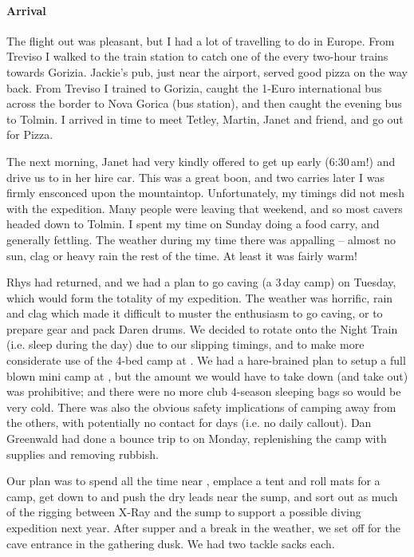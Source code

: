 \paragraph{Arrival}

The flight out was pleasant, but I had a lot of travelling to do in Europe. From Treviso I walked to the train station to catch one of the every two-hour trains towards Gorizia. Jackie's pub, just near the airport, served good pizza on the way back. From Treviso I trained to Gorizia, caught the 1-Euro international bus across the border to Nova Gorica (bus station), and then caught the evening bus to Tolmin. I arrived in time to meet Tetley, Martin, Janet and friend, and go out for Pizza.

The next morning, Janet had very kindly offered to get up early (6:30\,am!) and drive us to  in her hire car. This was a great boon, and two carries later I was firmly ensconced upon the mountaintop. Unfortunately, my timings did not mesh with the expedition. Many people were leaving that weekend, and so most cavers headed down to Tolmin. I spent my time on Sunday doing a food carry, and generally fettling. The weather during my time there was appalling -- almost no sun, clag or heavy rain the rest of the time. At least it was fairly warm!

Rhys had returned, and we had a plan to go caving (a 3\,day camp) on Tuesday, which would form the totality of my expedition. The weather was horrific, rain and clag which made it difficult to muster the enthusiasm to go caving, or to prepare gear and pack Daren drums. We decided to rotate onto the Night Train (i.e. sleep during the day) due to our slipping timings, and to make more considerate use of the 4-bed camp at . We had a hare-brained plan to setup a full blown mini camp at , but the amount we would have to take down (and take out) was prohibitive; and there were no more club 4-season sleeping bags so would be very cold. There was also the obvious safety implications of camping away from the others, with potentially no contact for days (i.e. no daily callout). Dan Greenwald had done a bounce trip to  on Monday, replenishing the camp with supplies and removing rubbish.

Our plan was to spend all the time near , emplace a tent and roll mats for a camp, get down to  and push the dry leads near the sump, and sort out as much of the rigging between X-Ray and the sump to support a possible diving expedition next year.
After supper and a break in the weather, we set off for the cave entrance in the gathering dusk. We had two tackle sacks each.


